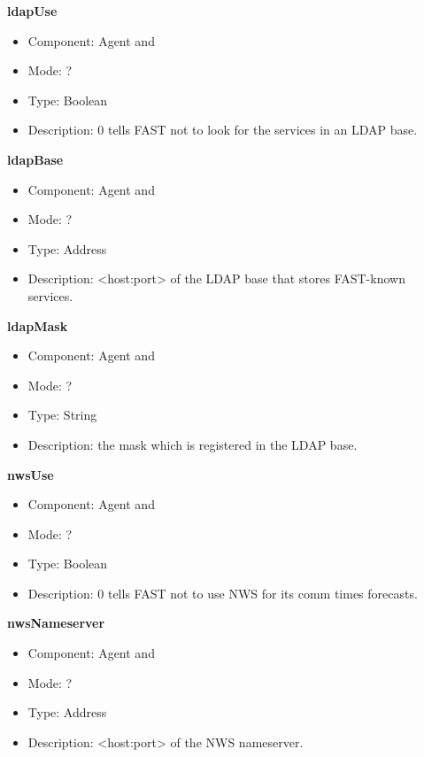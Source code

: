 \begin{description}
\item{\bf{ldapUse}}
  \begin{itemize}
  \item Component: Agent and \sed
  \item Mode: ?
  \item Type: Boolean
  \item Description: 0 tells FAST not to look for the services in an
    LDAP base.
  \end{itemize}

\item{\bf{ldapBase}}
  \begin{itemize}
  \item Component: Agent and \sed
  \item Mode: ?
  \item Type: Address 
  \item Description: <host:port> of the LDAP base that stores
    FAST-known services.
  \end{itemize}

\item{\bf{ldapMask}}
  \begin{itemize}
  \item Component: Agent and \sed
  \item Mode: ?
  \item Type: String
  \item Description: the mask which is registered in the LDAP base.
  \end{itemize}

\item{\bf{nwsUse}}
  \begin{itemize}
  \item Component: Agent and \sed
  \item Mode: ?
  \item Type: Boolean
  \item Description: 0 tells FAST not to use NWS for its comm times
    forecasts.
  \end{itemize}

\item{\bf{nwsNameserver}}
  \begin{itemize}
  \item Component: Agent and \sed
  \item Mode: ?
  \item Type: Address
  \item Description: <host:port> of the NWS nameserver.
  \end{itemize}


\end{description}

